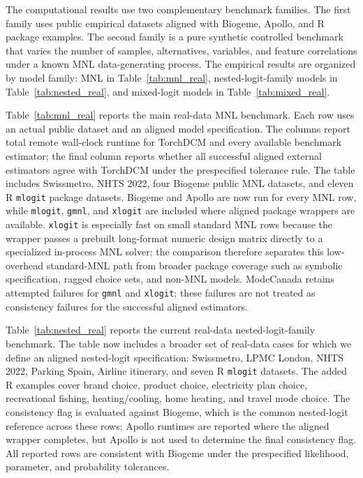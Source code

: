 The computational results use two complementary benchmark families.
The first family uses public empirical datasets aligned with Biogeme, Apollo, and R package examples.
The second family is a pure synthetic controlled benchmark that varies the number of samples, alternatives, variables, and feature correlations under a known MNL data-generating process.
The empirical results are organized by model family: MNL in Table~\ref{tab:mnl_real}, nested-logit-family models in Table~\ref{tab:nested_real}, and mixed-logit models in Table~\ref{tab:mixed_real}.



Table~\ref{tab:mnl_real} reports the main real-data MNL benchmark.
Each row uses an actual public dataset and an aligned model specification.
The columns report total remote wall-clock runtime for TorchDCM and every available benchmark estimator; the final column reports whether all successful aligned external estimators agree with TorchDCM under the prespecified tolerance rule.
The table includes Swissmetro, NHTS 2022, four Biogeme public MNL datasets, and eleven R \texttt{mlogit} package datasets.
Biogeme and Apollo are now run for every MNL row, while \texttt{mlogit}, \texttt{gmnl}, and \texttt{xlogit} are included where aligned package wrappers are available.
\texttt{xlogit} is especially fast on small standard MNL rows because the wrapper passes a prebuilt long-format numeric design matrix directly to a specialized in-process MNL solver; the comparison therefore separates this low-overhead standard-MNL path from broader package coverage such as symbolic specification, ragged choice sets, and non-MNL models.
ModeCanada retains attempted failures for \texttt{gmnl} and \texttt{xlogit}; these failures are not treated as consistency failures for the successful aligned estimators.



Table~\ref{tab:nested_real} reports the current real-data nested-logit-family benchmark.
The table now includes a broader set of real-data cases for which we define an aligned nested-logit specification: Swissmetro, LPMC London, NHTS 2022, Parking Spain, Airline itinerary, and seven R \texttt{mlogit} datasets.
The added R examples cover brand choice, product choice, electricity plan choice, recreational fishing, heating/cooling, home heating, and travel mode choice.
The consistency flag is evaluated against Biogeme, which is the common nested-logit reference across these rows; Apollo runtimes are reported where the aligned wrapper completes, but Apollo is not used to determine the final consistency flag.
All reported rows are consistent with Biogeme under the prespecified likelihood, parameter, and probability tolerances.

